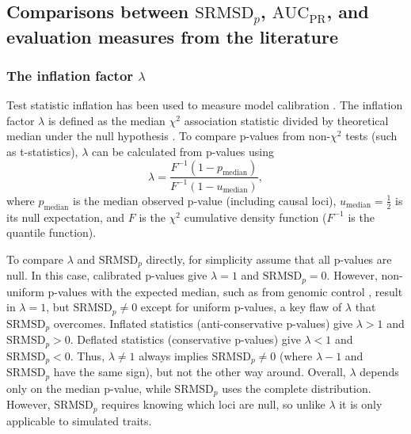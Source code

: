 \documentclass[9pt,lineno]{elife}
\newcommand{\rmsd}{\text{SRMSD}_p}
\newcommand{\auc}{\text{AUC}_\text{PR}}
\begin{document}
\begin{appendixbox}

  \label{sec:app-rmsd-auc}

  \subsection{Comparisons between $\rmsd$, $\auc$, and evaluation measures from the literature}

  \subsubsection{The inflation factor $\lambda$}

  Test statistic inflation has been used to measure model calibration \citep{astle_population_2009, price_new_2010}.
  The inflation factor $\lambda$ is defined as the median $\chi^2$ association statistic divided by theoretical median under the null hypothesis \citep{devlin_genomic_1999}.
  To compare p-values from non-$\chi^2$ tests (such as t-statistics), $\lambda$ can be calculated from p-values using
    $$
    \lambda
    =
    \frac{
      F^{-1} \left( 1 - p_\text{median} \right)
    }{
      F^{-1} \left( 1 - u_\text{median} \right)
    }
    ,
    $$
  where $p_\text{median}$ is the median observed p-value (including causal loci),
  $u_\text{median} = \frac{1}{2}$ is its null expectation,
  and $F$ is the $\chi^2$ cumulative density function ($F^{-1}$ is the quantile function).

  To compare $\lambda$ and $\rmsd$ directly, for simplicity assume that all p-values are null.
  In this case, calibrated p-values give $\lambda = 1$ and $\rmsd = 0$.
  However, non-uniform p-values with the expected median, such as from genomic control \citep{devlin_genomic_1999}, result in $\lambda = 1$, but $\rmsd \ne 0$ except for uniform p-values, a key flaw of $\lambda$ that $\rmsd$ overcomes.
  Inflated statistics (anti-conservative p-values) give $\lambda > 1$ and $\rmsd > 0$.
  Deflated statistics (conservative p-values) give $\lambda < 1$ and $\rmsd < 0$.
  Thus, $\lambda \ne 1$ always implies $\rmsd \ne 0$ (where $\lambda - 1$ and $\rmsd$ have the same sign), but not the other way around.
  Overall, $\lambda$ depends only on the median p-value, while $\rmsd$ uses the complete distribution.
  However, $\rmsd$ requires knowing which loci are null, so unlike $\lambda$ it is only applicable to simulated traits.


\end{appendixbox}
\end{document}
